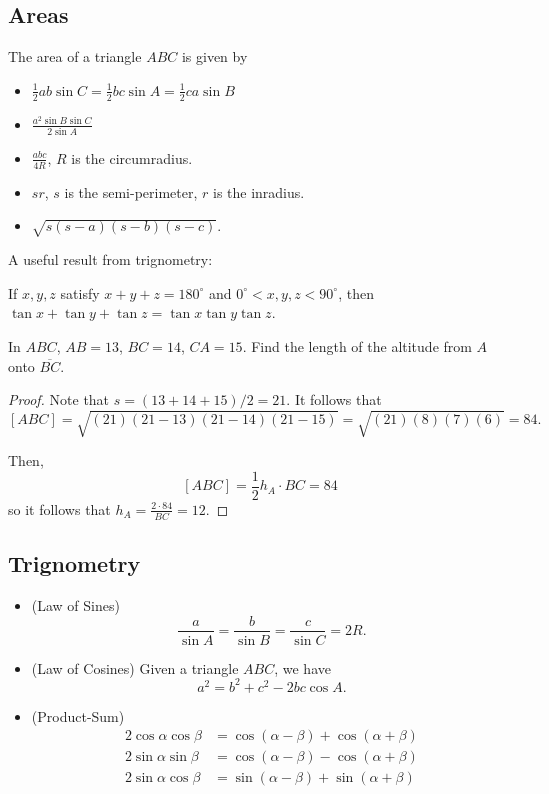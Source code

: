 \documentclass[11pt]{scrartcl}
\begin{document}
\subsection{Areas}
The area of a triangle $ABC$ is given by
\begin{itemize}
\item $\frac{1}{2}ab \sin C =\frac{1}{2}bc \sin A = \frac{1}{2}ca \sin B$
\item $\frac{a^2 \sin B \sin C}{2 \sin A}$
\item $\frac{abc}{4R}$, $R$ is the circumradius.
\item $sr$, $s$ is the semi-perimeter, $r$ is the inradius.
\item $\sqrt{s(s-a)(s-b)(s-c)}$.
\end{itemize}
A useful result from trignometry:
\begin{lemma} If $x, y, z$ satisfy $x + y + z = 180^\circ$ and $0^\circ < x , y, z < 90^\circ$, then $\tan x + \tan y + \tan z = \tan x \tan y \tan z$.
\end{lemma}
\begin{example} In $ABC$, $AB = 13$, $BC = 14$, $CA = 15$.  Find the length of the altitude from $A$ onto $\overline{BC}$.
\end{example}
\begin{proof}
Note that $s = (13 + 14 + 15)/2 = 21$.  It follows that 
$$[ABC] = \sqrt{(21)(21-13)(21-14)(21-15)} = \sqrt{(21)(8)(7)(6)} = 84.$$

Then, $$[ABC] = \frac{1}{2}h_A \cdot BC  = 84$$
so it follows that $h_A = \frac{2 \cdot 84}{BC} = 12$.
\end{proof}
\subsection{Trignometry}
\begin{itemize}
\item (Law of Sines) 
$$\frac{a}{ \sin A} = \frac{b}{\sin B} = \frac{c}{ \sin C} = 2R.$$
\item (Law of Cosines) Given a triangle $ABC$, we have 
$$a^2 = b^2 + c^2 - 2bc \cos A.$$
\item (Product-Sum)
\begin{align*}
2 \cos \alpha \cos \beta &= \cos(\alpha - \beta) + \cos (\alpha + \beta) \\
2 \sin\alpha \sin \beta &= \cos(\alpha - \beta) - \cos(\alpha + \beta) \\
2 \sin \alpha \cos \beta &= \sin(\alpha - \beta) + \sin(\alpha + \beta)
\end{align*}
\end{itemize}
\end{document}
